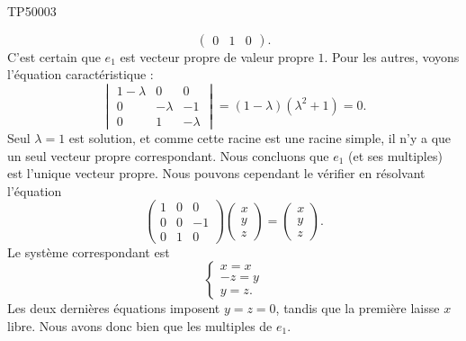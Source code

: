 \begin{corrige}{TP50003}
\begin{enumerate}
\begin{equation}
\begin{pmatrix}
				      0 & 1 & 0
			      \end{pmatrix}.
		      \end{equation}
		      C'est certain que $e_1$ est vecteur propre de valeur propre $1$. Pour les autres, voyons l'équation caractéristique :
		      \begin{equation}
			      \begin{vmatrix}
				      1-\lambda & 0        & 0        \\
				      0         & -\lambda & -1       \\
				      0         & 1        & -\lambda
			      \end{vmatrix}=(1-\lambda)(\lambda^2+1)=0.
		      \end{equation}
		      Seul $\lambda=1$ est solution, et comme cette racine est une racine simple, il n'y a que un seul vecteur propre correspondant. Nous concluons que $e_1$ (et ses multiples) est l'unique vecteur propre.
		      Nous pouvons cependant le vérifier en résolvant l'équation
		      \begin{equation}
			      \begin{pmatrix}
				      1 & 0 & 0  \\
				      0 & 0 & -1 \\
				      0 & 1 & 0
			      \end{pmatrix}\begin{pmatrix}
				      x \\
				      y \\
				      z
			      \end{pmatrix}=\begin{pmatrix}
				      x \\
				      y \\
				      z
			      \end{pmatrix}.
		      \end{equation}
		      Le système correspondant est
		      \begin{equation}
			      \begin{cases}
				      x=x  \\
				      -z=y \\
				      y=z.
			      \end{cases}
		      \end{equation}
		      Les deux dernières équations imposent $y=z=0$, tandis que la première laisse $x$ libre. Nous avons donc bien que les multiples de $e_1$.



\end{enumerate}
\end{corrige}
